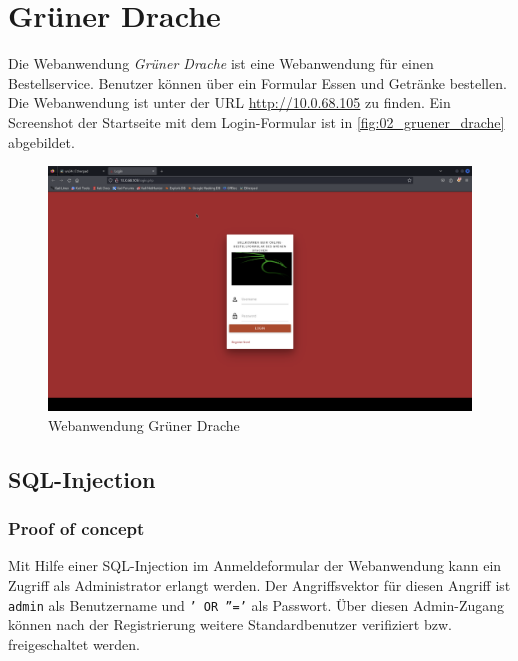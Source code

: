\chapter{Grüner Drache}
Die Webanwendung \textit{Grüner Drache} ist eine Webanwendung für einen Bestellservice. Benutzer können über ein Formular Essen und Getränke bestellen. Die Webanwendung ist unter der URL \url{http://10.0.68.105} zu finden. Ein Screenshot der Startseite mit dem Login-Formular ist in \autoref{fig:02_gruener_drache} abgebildet.

\vfill
\begin{figure}[!ht]
    \centering
    \includegraphics[width=\linewidth]{images/screenshots/04_gruener_drache.png}
    \caption{Webanwendung Grüner Drache}
    \label{fig:02_gruener_drache}
\end{figure}
\vfill
\newpage


\section{\makecvssbadge SQL-Injection}

\subsection*{Proof of concept}

Mit Hilfe einer SQL-Injection im Anmeldeformular der Webanwendung kann ein Zugriff als Administrator erlangt werden. Der Angriffsvektor für diesen Angriff ist \texttt{admin} als Benutzername und \texttt{' OR ''='} als Passwort. Über diesen Admin-Zugang können nach der Registrierung weitere Standardbenutzer verifiziert bzw. freigeschaltet werden.

